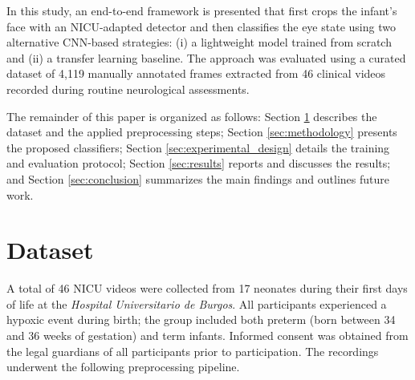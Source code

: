 \documentclass[runningheads]{llncs}
\begin{document}
In this study, an end-to-end framework is presented that first crops the infant’s face with an NICU-adapted detector and then classifies the eye state using two alternative CNN-based strategies: (i) a lightweight model trained from scratch and (ii) a transfer learning baseline. The approach was evaluated using a curated dataset of 4,119 manually annotated frames extracted from 46 clinical videos recorded during routine neurological assessments.

The remainder of this paper is organized as follows: Section \ref{sec:dataset} describes the dataset and the applied preprocessing steps; Section \ref{sec:methodology} presents the proposed classifiers; Section \ref{sec:experimental_design} details the training and evaluation protocol; Section \ref{sec:results} reports and discusses the results; and Section \ref{sec:conclusion} summarizes the main findings and outlines future work.

\section{Dataset}
\label{sec:dataset}

A total of 46 NICU videos were collected from 17 neonates during their first days of life at the \textit{Hospital Universitario de Burgos}. All participants experienced a hypoxic event during birth; the group included both preterm (born between 34 and 36 weeks of gestation) and term infants. Informed consent was obtained from the legal guardians of all participants prior to participation. The recordings underwent the following preprocessing pipeline.
\end{document}
